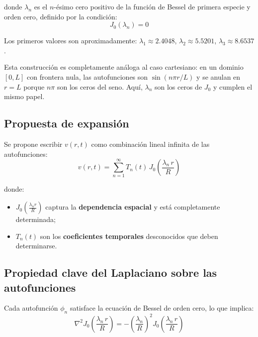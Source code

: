 \documentclass[12pt, a4paper]{article}
\newenvironment{nota}{%
  \begin{tcolorbox}[notaestilo]%
}{%
  \end{tcolorbox}%
}
\begin{document}
donde $\lambda_n$ es el $n$-ésimo cero positivo de la función de Bessel de primera especie y
orden cero, definido por la condición:
\begin{equation}
  J_0(\lambda_n) = 0
\end{equation}

Los primeros valores son aproximadamente: $\lambda_1 \approx 2.4048$, $\lambda_2 \approx 5.5201$,
$\lambda_3 \approx 8.6537$.

\begin{nota}
Esta construcción es completamente análoga al caso cartesiano: en un dominio $[0,L]$
con frontera nula, las autofunciones son $\sin(n\pi r/L)$ y se anulan en $r = L$
porque $n\pi$ son los ceros del seno. Aquí, $\lambda_n$ son los ceros de $J_0$
y cumplen el mismo papel.
\end{nota}

\subsection{Propuesta de expansión}

Se propone escribir $v(r,t)$ como combinación lineal infinita de las autofunciones:
\begin{equation}
  \boxed{v(r,t) = \sum_{n=1}^{\infty} T_n(t)\, J_0\!\left(\frac{\lambda_n\, r}{R}\right)}
  \label{eq:expansion}
\end{equation}

donde:
\begin{itemize}[leftmargin=2em]
  \item $J_0\!\left(\tfrac{\lambda_n r}{R}\right)$ captura la \textbf{dependencia espacial} y está completamente determinada;
  \item $T_n(t)$ son los \textbf{coeficientes temporales} desconocidos que deben determinarse.
\end{itemize}

\subsection{Propiedad clave del Laplaciano sobre las autofunciones}

Cada autofunción $\phi_n$ satisface la ecuación de Bessel de orden cero, lo que implica:
\begin{equation}
  \nabla^2 J_0\!\left(\frac{\lambda_n\, r}{R}\right)
  = -\left(\frac{\lambda_n}{R}\right)^2 J_0\!\left(\frac{\lambda_n\, r}{R}\right)
  \label{eq:eigenvalor}
\end{equation}
\end{document}
